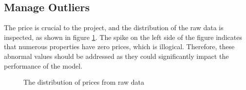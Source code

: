 \documentclass[12pt,twoside]{report}
\begin{document}
\subsection{Manage Outliers}
The price is crucial to the project, and the distribution of the raw data is inspected, as shown in figure \ref{price_raw}. The spike on the left side of the figure indicates that numerous properties have zero prices, which is illogical. Therefore, these abnormal values should be addressed as they could significantly impact the performance of the model.

\begin{figure}[!htbp]
	\centering
	\hfill
	\hfill
	\caption{The distribution of prices from raw data}
	\label{price_raw}
\end{figure}
\end{document}
